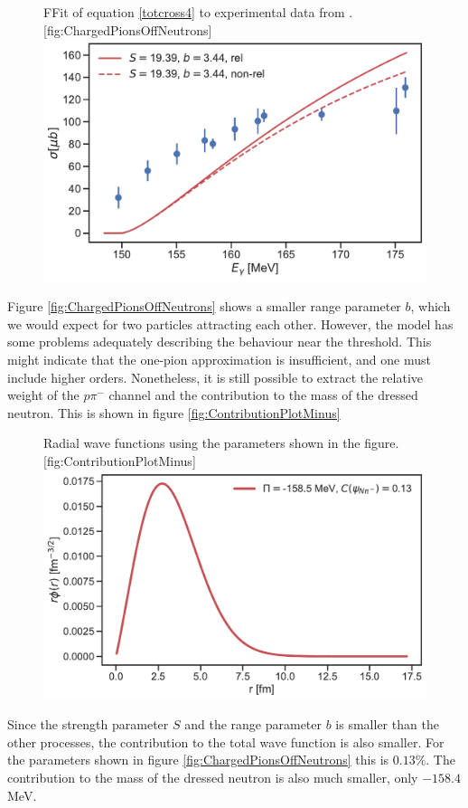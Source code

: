 \begin{figure}[H]
	\begin{sidecaption}{FFit of equation \eqref{totcross4} to experimental data from \cite{PionOffNeutron}.}[fig:ChargedPionsOffNeutrons]
		\includegraphics[width=\linewidth]{Figures/ChargedPionOffNeutron.pdf}
	\end{sidecaption}
\end{figure}
Figure \ref{fig:ChargedPionsOffNeutrons} shows a smaller range parameter $b$, which we would expect for two particles attracting each other. However, the model has some problems adequately describing the behaviour near the threshold. This might indicate that the one-pion approximation is insufficient, and one must include higher orders. Nonetheless, it is still possible to extract the relative weight of the $p\pi^-$ channel and the contribution to the mass of the dressed neutron. This is shown in figure \ref{fig:ContributionPlotMinus}
\begin{figure}[H]
	\begin{sidecaption}{Radial wave functions using the parameters shown in the figure. }[fig:ContributionPlotMinus]
		\includegraphics[width=\linewidth]{Figures/ContributionPlotPiMinus.pdf}
	\end{sidecaption}
\end{figure}
Since the strength parameter $S$ and the range parameter $b$ is smaller than the other processes, the contribution to the total wave function is also smaller. For the parameters shown in figure \ref{fig:ChargedPionsOffNeutrons} this is $0.13\%$. The contribution to the mass of the dressed neutron is also much smaller, only $-158.4$ MeV.

